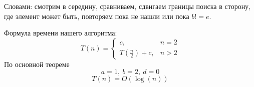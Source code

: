 \documentclass[../book.tex]{subfiles}
\begin{document}
	Словами: смотрим в середину, сравниваем, сдвигаем границы поиска в сторону, где элемент может быть, повторяем пока не нашли или пока $b != e$.
	
	
	\begin{time}
		Формула времени нашего алгоритма:
		\[
		T(n) = 
		\begin{cases}
			c, & n = 2 \\
			T(\frac{n}{2}) + c, & n > 2
		\end{cases}
		\]
		По основной теореме 
		\[
		a = 1, \ b = 2, \ d = 0
		\]
		\[
		T(n) = O(\log(n))
		\]
	\end{time}
	
	
	
	\pagebreak
	
\end{document}
